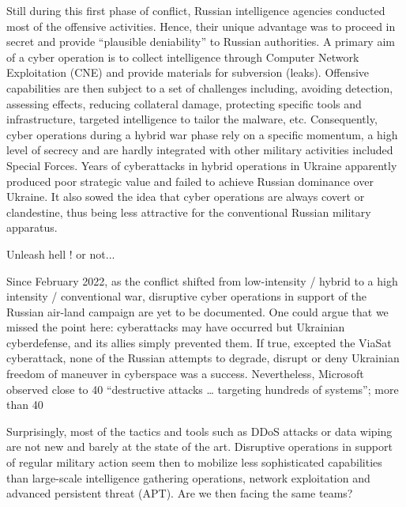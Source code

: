 Still during this first phase of conflict, Russian intelligence agencies conducted most of the offensive activities. Hence, their unique advantage was to proceed in secret and provide “plausible deniability” to Russian authorities. A primary aim of a cyber operation is to collect intelligence through Computer Network Exploitation (CNE) and provide materials for subversion (leaks). Offensive capabilities are then subject to a set of challenges including, avoiding detection, assessing effects, reducing collateral damage, protecting specific tools and infrastructure, targeted intelligence to tailor the malware, etc. Consequently, cyber operations during a hybrid war phase rely on a specific momentum, a high level of secrecy and are hardly integrated with other military activities included Special Forces. Years of cyberattacks in hybrid operations in Ukraine apparently produced poor strategic value and failed to achieve Russian dominance over Ukraine. It also sowed the idea that cyber operations are always covert or clandestine, thus being less attractive for the conventional Russian military apparatus.



Unleash hell ! or not...

Since February 2022, as the conflict shifted from low-intensity / hybrid to a high intensity / conventional war, disruptive cyber operations in support of the Russian air-land campaign are yet to be documented. One could argue that we missed the point here: cyberattacks may have occurred but Ukrainian cyberdefense, and its allies simply prevented them. If true, excepted the ViaSat cyberattack, none of the Russian attempts to degrade, disrupt or deny Ukrainian freedom of maneuver in cyberspace was a success. Nevertheless, Microsoft observed close to 40 “destructive attacks … targeting hundreds of systems”; more than 40%

Surprisingly, most of the tactics and tools such as DDoS attacks or data wiping are not new and barely at the state of the art. Disruptive operations in support of regular military action seem then to mobilize less sophisticated capabilities than large-scale intelligence gathering operations, network exploitation and advanced persistent threat (APT). Are we then facing the same teams?

